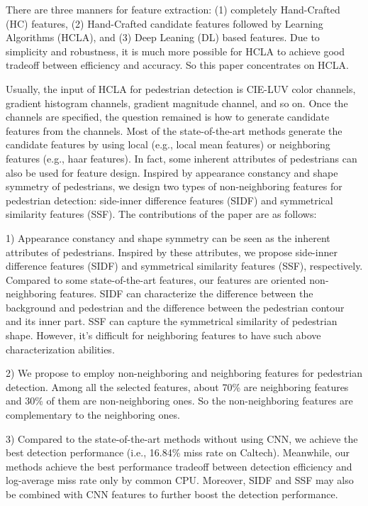 \documentclass[10pt,twocolumn,letterpaper]{article}
\begin{document}
There are three manners for feature extraction: (1) completely Hand-Crafted 
(HC) features, (2) Hand-Crafted candidate features followed by Learning 
Algorithms (HCLA), and (3) Deep Leaning 
(DL) based features. Due to simplicity and robustness, it is much more 
possible for HCLA to achieve good tradeoff between efficiency and accuracy. So this paper concentrates 
on HCLA. 

Usually, the input of HCLA for pedestrian detection is CIE-LUV color channels, 
gradient histogram channels, gradient magnitude channel, and so on. Once the 
channels are specified, the question remained is how to generate candidate features 
from the channels. Most of the state-of-the-art methods generate the 
candidate features by using local (e.g., local mean features) or neighboring 
features (e.g., haar features). In fact, some inherent attributes of 
pedestrians can also be used for feature design. Inspired by appearance 
constancy and shape symmetry of pedestrians, we design two types of 
non-neighboring features for pedestrian detection: side-inner difference 
features (SIDF) and symmetrical similarity features (SSF). The contributions 
of the paper are as follows:

1) Appearance constancy and shape symmetry can be seen as the inherent attributes of 
pedestrians. Inspired by these attributes, we propose side-inner difference 
features (SIDF) and symmetrical similarity features (SSF), respectively. 
Compared to some state-of-the-art features, our features are oriented 
non-neighboring features. SIDF can characterize the difference between the background 
and pedestrian and the difference between the pedestrian contour and its 
inner part. SSF can capture the symmetrical similarity of pedestrian shape. 
However, it's difficult for neighboring features to have such above 
characterization abilities. 

2) We propose to employ non-neighboring and neighboring features for 
pedestrian detection. Among all the selected features, about 70{\%}  are neighboring features and 30{\%} of them are 
non-neighboring ones. So the non-neighboring features are complementary to 
the neighboring ones.

3) Compared to the state-of-the-art methods without using CNN, we achieve 
the best detection performance (i.e., 16.84{\%} miss rate on Caltech). 
Meanwhile, our methods achieve the best performance tradeoff between 
detection efficiency and log-average miss rate only by common CPU. Moreover, 
SIDF and SSF may also be combined with CNN features to further boost the 
detection performance.
\end{document}

